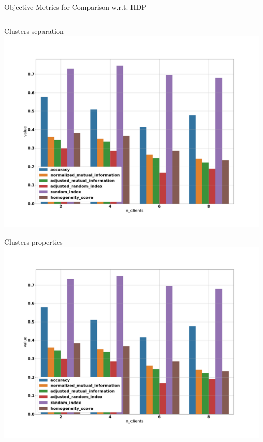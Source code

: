 \documentclass{beamer}
\begin{document}
\begin{frame}{Objective Metrics for Comparison w.r.t. HDP}
\begin{minipage}[\textheight]{\textwidth}
\begin{columns}[T]
\begin{column}{0.6\textwidth}
	\end{column}
\end{columns}
\end{minipage}
\end{frame}

\begin{frame}{Clusters separation}
	\centering
	\includegraphics[width=\textwidth, keepaspectratio]{./images/metrics.png}
\end{frame}

\begin{frame}{Clusters properties}
	\centering
	\includegraphics[width=\textwidth, keepaspectratio]{./images/metrics.png}
\end{frame}
\end{document}
